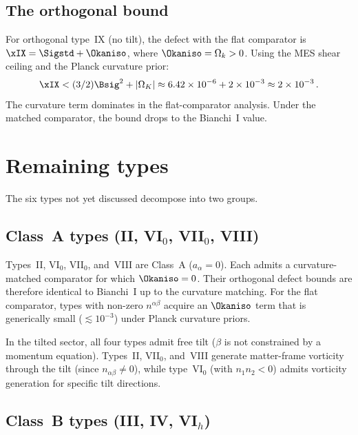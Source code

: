\subsection{The orthogonal bound}

For orthogonal type~IX (no tilt), the defect with the flat
comparator is $\xIX = \Sigstd + \Okaniso$, where
$\Okaniso = \Omega_k > 0$.  Using the MES shear ceiling and the
Planck curvature prior:
\begin{equation}
\xIX < (3/2)\Bsig^2 + |\Omega_K|
\approx 6.42 \times 10^{-6} + 2 \times 10^{-3}
\approx 2 \times 10^{-3}\,.
\end{equation}
The curvature term dominates in the flat-comparator analysis.
Under the matched comparator, the bound drops to the
Bianchi~I value.


\section{Remaining types}\label{sec:classAB}

The six types not yet discussed decompose into two groups.

\subsection{Class~A types (II, VI$_0$, VII$_0$, VIII)}

Types~II, VI$_0$, VII$_0$, and~VIII are Class~A
($a_\alpha = 0$).  Each admits a curvature-matched comparator
for which $\Okaniso = 0$.  Their orthogonal defect bounds are
therefore identical to Bianchi~I up to the curvature matching.
For the flat comparator, types with non-zero $n^{\alpha\beta}$
acquire an $\Okaniso$ term that is generically small
($\lesssim 10^{-3}$) under Planck curvature priors.

In the tilted sector, all four types admit free tilt ($\beta$ is
not constrained by a momentum equation).  Types~II, VII$_0$,
and~VIII generate matter-frame vorticity through the tilt
(since $n_{\alpha\beta} \neq 0$), while type~VI$_0$ (with
$n_1 n_2 < 0$) admits vorticity generation for specific tilt
directions.


\subsection{Class~B types (III, IV, VI$_h$)}

